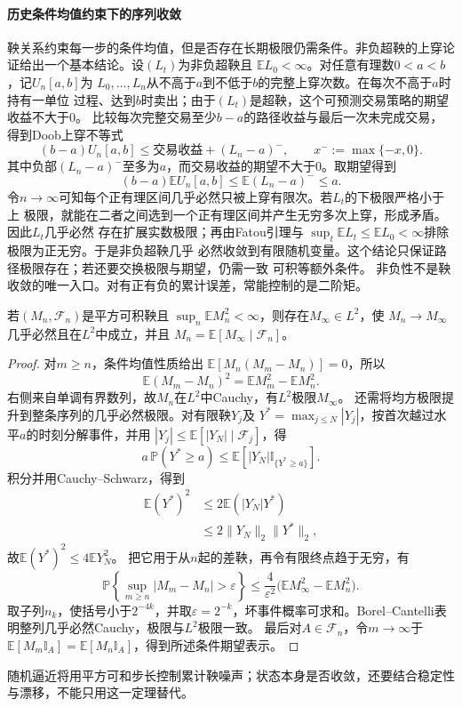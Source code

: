 \paragraph{历史条件均值约束下的序列收敛}
鞅关系约束每一步的条件均值，但是否存在长期极限仍需条件。非负超鞅的上穿论证给出一个基本结论。设$(L_t)$为非负超鞅且
$\mathbb{E}L_0<\infty$。对任意有理数$0<a<b$，记$U_n[a,b]$为
$L_0,\ldots,L_n$从不高于$a$到不低于$b$的完整上穿次数。在每次不高于$a$时持有一单位
过程、达到$b$时卖出；由于$(L_t)$是超鞅，这个可预测交易策略的期望收益不大于$0$。
比较每次完整交易至少$b-a$的路径收益与最后一次未完成交易，得到Doob上穿不等式
\[
  (b-a)U_n[a,b]
  \leq
  \text{交易收益}+(L_n-a)^-,
  \qquad x^-:=\max\{-x,0\}.
\]
其中负部$(L_n-a)^-$至多为$a$，而交易收益的期望不大于$0$。取期望得到
\[
  (b-a)\mathbb{E}U_n[a,b]
  \leq
  \mathbb{E}(L_n-a)^-
  \leq
  a.
\]
令$n\to\infty$可知每个正有理区间几乎必然只被上穿有限次。若$L_t$的下极限严格小于上
极限，就能在二者之间选到一个正有理区间并产生无穷多次上穿，形成矛盾。因此$L_t$几乎必然
存在扩展实数极限；再由Fatou引理与
$\sup_t\mathbb{E}L_t\leq\mathbb{E}L_0<\infty$排除极限为正无穷。于是非负超鞅几乎
必然收敛到有限随机变量。这个结论只保证路径极限存在；若还要交换极限与期望，仍需一致
可积等额外条件。
非负性不是鞅收敛的唯一入口。对有正有负的累计误差，常能控制的是二阶矩。
\begin{theorem}[二阶矩有界鞅的收敛]
\label{thm:rv-l2-martingale-convergence}
若\((M_n,\mathcal F_n)\)是平方可积鞅且
\(\sup_n\mathbb E M_n^2<\infty\)，则存在\(M_\infty\in L^2\)，使
\(M_n\to M_\infty\)几乎必然且在\(L^2\)中成立，并且
\(M_n=\mathbb E[M_\infty\mid\mathcal F_n]\)。
\end{theorem}
\begin{proof}
对\(m\geq n\)，条件均值性质给出
\(\mathbb E[M_n(M_m-M_n)]=0\)，所以
\[
\mathbb E(M_m-M_n)^2=\mathbb EM_m^2-\mathbb EM_n^2.
\]
右侧来自单调有界数列，故\(M_n\)在\(L^2\)中Cauchy，有\(L^2\)极限\(M_\infty\)。
还需将均方极限提升到整条序列的几乎必然极限。对有限鞅\(Y_j\)及
\(Y^*=\max_{j\leq N}|Y_j|\)，按首次越过水平\(a\)的时刻分解事件，并用
\(|Y_j|\leq\mathbb E[|Y_N|\mid\mathcal F_j]\)，得
\[
a\,\mathbb P(Y^*\geq a)
\leq\mathbb E[|Y_N|\mathbb I_{\{Y^*\geq a\}}].
\]
积分并用Cauchy--Schwarz，得到
\[
\begin{aligned}
 \mathbb E(Y^*)^2
 &\leq2\mathbb E(|Y_N|Y^*)\\
 &\leq2\|Y_N\|_2\|Y^*\|_2,
\end{aligned}
\]
故\(\mathbb E(Y^*)^2\leq4\mathbb E Y_N^2\)。
把它用于从\(n\)起的差鞅，再令有限终点趋于无穷，有
\[
\mathbb P\left\{\sup_{m\geq n}|M_m-M_n|>\varepsilon\right\}
\leq\frac4{\varepsilon^2}
\bigl(\mathbb EM_\infty^2-\mathbb EM_n^2\bigr).
\]
取子列\(n_k\)，使括号小于\(2^{-4k}\)，并取\(\varepsilon=2^{-k}\)，坏事件概率可求和。Borel--Cantelli表明整列几乎必然Cauchy，极限与\(L^2\)极限一致。
最后对\(A\in\mathcal F_n\)，令\(m\to\infty\)于
\(\mathbb E[M_m\mathbb I_A]=\mathbb E[M_n\mathbb I_A]\)，得到所述条件期望表示。
\end{proof}
随机逼近将用平方可和步长控制累计鞅噪声；状态本身是否收敛，还要结合稳定性与漂移，不能只用这一定理替代。

